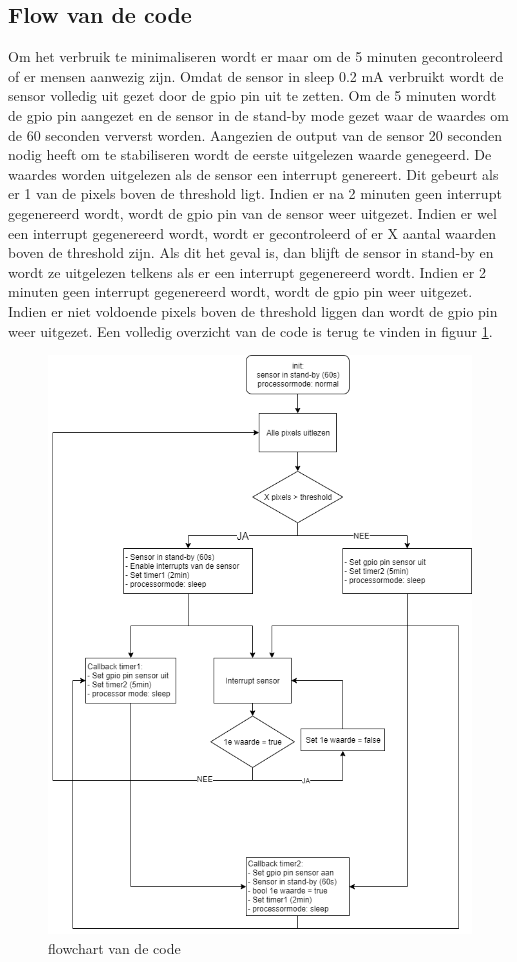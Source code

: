 \documentclass[]{article}
\begin{document}
\subsection{Flow van de code}
\label{flowcode}
Om het verbruik te minimaliseren wordt er maar om de 5 minuten gecontroleerd of er mensen aanwezig zijn. Omdat de sensor in sleep 0.2 mA verbruikt wordt de sensor volledig uit gezet door de gpio pin uit te zetten. Om de 5 minuten wordt de gpio pin aangezet en de sensor in de stand-by mode gezet waar de waardes om de 60 seconden ververst worden. Aangezien de output van de sensor 20 seconden nodig heeft om te stabiliseren wordt de eerste uitgelezen waarde genegeerd. De waardes worden uitgelezen als de sensor een interrupt genereert. Dit gebeurt als er 1 van de pixels boven de threshold ligt. Indien er na 2 minuten geen interrupt gegenereerd wordt, wordt de gpio pin van de sensor weer uitgezet. Indien er wel een interrupt gegenereerd wordt, wordt er gecontroleerd of er X aantal waarden boven de threshold zijn. Als dit het geval is, dan blijft de sensor in stand-by en wordt ze uitgelezen telkens als er een interrupt gegenereerd wordt. Indien er 2 minuten geen interrupt gegenereerd wordt, wordt de gpio pin weer uitgezet. Indien er niet voldoende pixels boven de threshold liggen dan wordt de gpio pin weer uitgezet. Een volledig overzicht van de code is terug te vinden in figuur \ref{fig:flowchart}.
\begin{figure}[!ht]
	\centering
	\includegraphics[scale=0.5]{flowchartcode.png}
	\caption{flowchart van de code}
	\label{fig:flowchart}
\end{figure}
\end{document}
